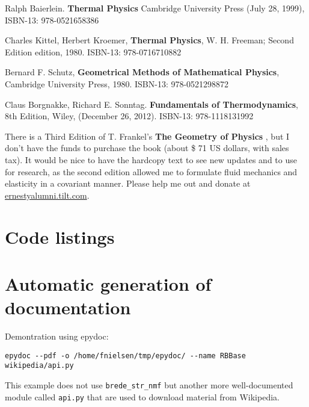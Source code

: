 \documentclass[10pt]{amsart}
\begin{document}
\begin{thebibliography}{9}

Ralph Baierlein. \textbf{Thermal Physics} Cambridge University Press (July 28, 1999), ISBN-13: 978-0521658386

Charles Kittel, Herbert Kroemer, \textbf{Thermal Physics}, W. H. Freeman; Second Edition edition, 1980. 
ISBN-13: 978-0716710882

Bernard F. Schutz, \textbf{Geometrical Methods of Mathematical Physics}, Cambridge University Press, 1980.
ISBN-13: 978-0521298872

Claus Borgnakke, Richard E. Sonntag.  \textbf{Fundamentals of Thermodynamics}, 8th Edition, Wiley, (December 26, 2012). 
ISBN-13: 978-1118131992  

\end{thebibliography}
There is a Third Edition of T. Frankel's \textbf{The Geometry of Physics} \cite{TFrankel2004}, but I don't have the funds to purchase the book (about \$ 71 US dollars, with sales tax). It would be nice to have the hardcopy text to see new updates and to use for research, as the second edition allowed me to formulate fluid mechanics and elasticity in a covariant manner.  Please help me out and donate at \url{ernestyalumni.tilt.com}.  




\clearpage
\onecolumn

\section{Code listings}

\lstlistoflistings




\newpage
\section{Automatic generation of documentation}

Demontration using epydoc:
\begin{verbatim}
epydoc --pdf -o /home/fnielsen/tmp/epydoc/ --name RBBase wikipedia/api.py
\end{verbatim}
This example does not use \verb!brede_str_nmf! but another more
well-documented module called {\tt api.py} that are used to download
material from Wikipedia. 

%
\end{document}
